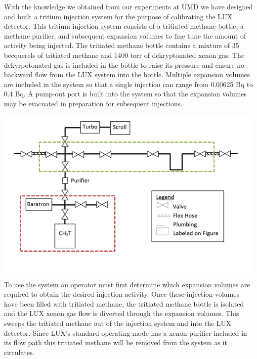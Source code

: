 \documentclass[a4paper,12pt]{article}
\begin{document}
With the knowledge we obtained from our experiments at UMD we have designed and built a tritium injection system for the purpose of calibrating the LUX detector.  This tritium injection system consists of a tritiated methane bottle, a methane purifier, and subsequent expansion volumes to fine tune the amount of activity being injected.  The tritiated methane bottle contains a mixture of 35 becquerels of tritiated methane and 1400 torr of dekryptonated xenon gas.  The dekyrpotonated gas is included in the bottle to raise its pressure and ensure no backward flow from the LUX system into the bottle.  Multiple expansion volumes are included in the system so that a single injection can range from 0.00625 Bq to 0.4 Bq.  A pump-out port is built into the system so that the expansion volumes may be evacuated in preparation for subsequent injections.

\begin{center}
\includegraphics[scale=0.7]{Injection_Plumbing_Colored.png}
\end{center}

To use the system an operator must first determine which expansion volumes are required to obtain the desired injection activity.  Once these injection volumes have been filled with tritiated methane, the tritiated methane bottle is isolated and the LUX xenon gas flow is diverted through the expansion volumes.  This sweeps the tritiated methane out of the injection system and into the LUX detector.  Since LUX's standard operating mode has a xenon purifier included in its flow path this tritiated methane will be removed from the system as it circulates. 
\end{document}
